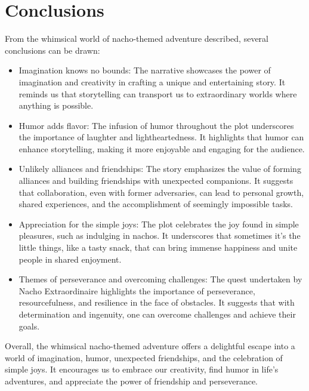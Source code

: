 \section{Conclusions}

From the whimsical world of nacho-themed adventure described, several conclusions can be drawn:

\begin{itemize}
\item Imagination knows no bounds: The narrative showcases the power of imagination and creativity in crafting a unique and entertaining story. It reminds us that storytelling can transport us to extraordinary worlds where anything is possible.

\item Humor adds flavor: The infusion of humor throughout the plot underscores the importance of laughter and lightheartedness. It highlights that humor can enhance storytelling, making it more enjoyable and engaging for the audience.

\item Unlikely alliances and friendships: The story emphasizes the value of forming alliances and building friendships with unexpected companions. It suggests that collaboration, even with former adversaries, can lead to personal growth, shared experiences, and the accomplishment of seemingly impossible tasks.

\item Appreciation for the simple joys: The plot celebrates the joy found in simple pleasures, such as indulging in nachos. It underscores that sometimes it's the little things, like a tasty snack, that can bring immense happiness and unite people in shared enjoyment.

\item Themes of perseverance and overcoming challenges: The quest undertaken by Nacho Extraordinaire highlights the importance of perseverance, resourcefulness, and resilience in the face of obstacles. It suggests that with determination and ingenuity, one can overcome challenges and achieve their goals.
\end{itemize}

Overall, the whimsical nacho-themed adventure offers a delightful escape into a world of imagination, humor, unexpected friendships, and the celebration of simple joys. It encourages us to embrace our creativity, find humor in life's adventures, and appreciate the power of friendship and perseverance.